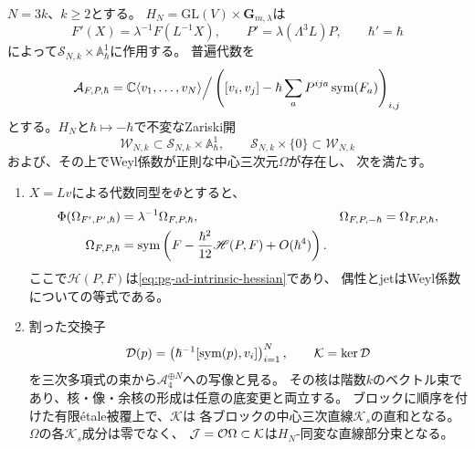 \begin{theorem}[満support層の全係数にわたる同変中心元]
\label{thm:pg-intrinsic-full-support-center}
$N=3k$、$k\ge2$とする。
$H_N=\mathrm{GL}(V)\times\mathbf G_{m,\lambda}$は
\begin{equation}
 F'(X)=\lambda^{-1}F(L^{-1}X),\qquad
 P'=\lambda(\Lambda^3L)P,\qquad
 \hbar'=\hbar
 \label{eq:pg-full-support-group-action}
\end{equation}
によって$\mathcal S_{N,k}\times\mathbb A^1_\hbar$に作用する。
普遍代数を
\begin{equation}
 \mathcal A_{F,P,\hbar}
 =\mathbb C\langle v_1,\ldots,v_N\rangle\Big/
 \left([v_i,v_j]-\hbar\sum_aP^{ija}\operatorname{sym}(F_a)\right)_{i,j}
 \label{eq:pg-full-support-ambient-algebra}
\end{equation}
とする。$H_N$と$\hbar\mapsto-\hbar$で不変なZariski開
\begin{equation}
 \mathcal W_{N,k}\subset\mathcal S_{N,k}\times\mathbb A^1_\hbar,
 \qquad
 \mathcal S_{N,k}\times\{0\}\subset\mathcal W_{N,k}
 \label{eq:pg-full-support-good-open}
\end{equation}
および、その上でWeyl係数が正則な中心三次元$\Omega$が存在し、
次を満たす。
\begin{enumerate}
\item $X=Lv$による代数同型を$\Phi$とすると、
\begin{equation}
 \begin{aligned}
 \Phi(\Omega_{F',P',\hbar})&=\lambda^{-1}\Omega_{F,P,\hbar},&
 \Omega_{F,P,-\hbar}&=\Omega_{F,P,\hbar},\\
 \Omega_{F,P,\hbar}
 &=\operatorname{sym}\left(F-\frac{\hbar^2}{12}\mathscr H(P,F)
                  +O(\hbar^4)\right).
 \end{aligned}
 \label{eq:pg-full-support-equivariant-jet}
\end{equation}
ここで$\mathscr H(P,F)$は\eqref{eq:pg-ad-intrinsic-hessian}であり、
偶性とjetはWeyl係数についての等式である。
\item 割った交換子
\begin{equation}
 \mathcal D(p)=
 \left(\hbar^{-1}[\operatorname{sym}(p),v_i]\right)_{i=1}^N,
 \qquad\mathcal K=\ker\mathcal D
 \label{eq:pg-full-support-divided-kernel}
\end{equation}
を三次多項式の束から$\mathcal A_4^{\oplus N}$への写像と見る。
その核は階数$k$のベクトル束であり、核・像・余核の形成は任意の底変更と両立する。
ブロックに順序を付けた有限\'{e}tale被覆上で、$\mathcal K$は
各ブロックの中心三次直線$\mathcal K_s$の直和となる。
$\Omega$の各$\mathcal K_s$成分は零でなく、
$\mathcal J=\mathcal O\Omega\subset\mathcal K$は$H_N$-同変な直線部分束となる。

\end{enumerate}
\end{theorem}
